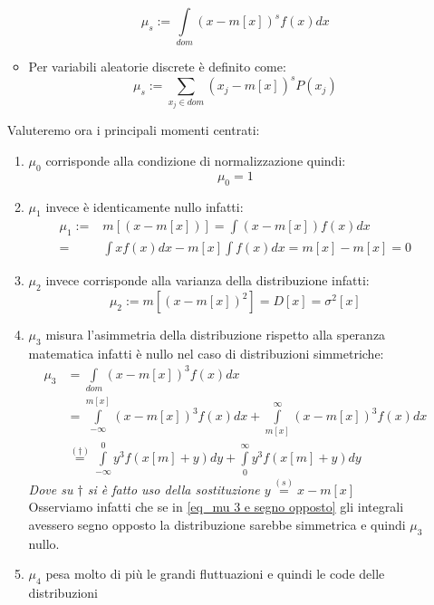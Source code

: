 \documentclass[11pt,a4paper]{book}
\begin{document}
\begin{itemize}
\begin{itemize}
\begin{equation}
\mu_s := \int\limits_{\textit{dom}}(x-m[x])^s f(x)dx
\end{equation}
\item Per variabili aleatorie discrete è definito come:
\begin{equation}
\mu_s := \sum\limits_{x_j \in \textit{dom}}(x_j-m[x])^sP(x_j)
\end{equation}
\end{itemize}
Valuteremo ora i principali momenti centrati:
\begin{enumerate}[start=0]
\item $\mu_0 $ corrisponde alla condizione di normalizzazione quindi:
\begin{equation}
\mu_0 = 1
\end{equation}
\item $ \mu_1 $ invece è identicamente nullo infatti:
\begin{align}
\mu_1 :=& m[(x-m[x])] = \int(x-m[x])f(x)dx \\
=& \int xf(x)dx - m[x]\int f(x)dx = m[x]-m[x] = 0
\end{align}
\item $ \mu_2 $ invece corrisponde alla varianza della distribuzione infatti:
\begin{equation}
\mu_2 := m[(x-m[x])^2] = D[x] = \sigma^2[x]
\end{equation}
\item $ \mu_3 $ misura l'asimmetria della distribuzione rispetto alla speranza matematica infatti è nullo nel caso di distribuzioni simmetriche:
\begin{equation}
\begin{split}
\mu_3 &= \int\limits_{dom}(x-m[x])^3f(x)dx \\
&=\int\limits_{-\infty}^{m[x]}(x-m[x])^3f(x)dx +\int\limits_{m[x]}^{\infty}(x-m[x])^3f(x)dx\\
&\stackrel{(\dag)}{=} \int\limits_{-\infty}^{0}y^3f(x[m]+y) dy + \int\limits_{0}^{\infty}y^3f(x[m]+y) dy \label{eq_mu 3 e segno opposto}
\end{split}
\end{equation}
\textit{Dove su $ \dag $ si è fatto uso della sostituzione $ y \stackrel{(s)}{=}x-m[x] $} \\
Osserviamo infatti che se in \eqref{eq_mu 3 e segno opposto} gli integrali avessero segno opposto la distribuzione sarebbe simmetrica e quindi $ \mu_3 $ nullo. \\
\item $ \mu_4 $ pesa molto di più le grandi fluttuazioni e quindi le code delle distribuzioni
\end{enumerate}
\end{itemize}
\end{document}
